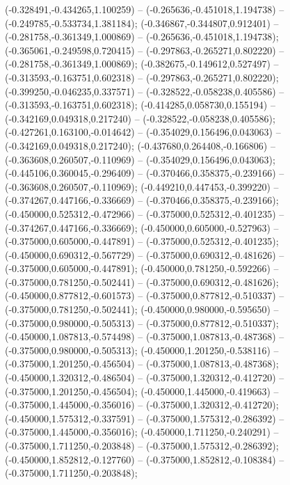  (-0.328491,-0.434265,1.100259) -- (-0.265636,-0.451018,1.194738) -- (-0.249785,-0.533734,1.381184);
 (-0.346867,-0.344807,0.912401) -- (-0.281758,-0.361349,1.000869) -- (-0.265636,-0.451018,1.194738);
 (-0.365061,-0.249598,0.720415) -- (-0.297863,-0.265271,0.802220) -- (-0.281758,-0.361349,1.000869);
 (-0.382675,-0.149612,0.527497) -- (-0.313593,-0.163751,0.602318) -- (-0.297863,-0.265271,0.802220);
 (-0.399250,-0.046235,0.337571) -- (-0.328522,-0.058238,0.405586) -- (-0.313593,-0.163751,0.602318);
 (-0.414285,0.058730,0.155194) -- (-0.342169,0.049318,0.217240) -- (-0.328522,-0.058238,0.405586);
 (-0.427261,0.163100,-0.014642) -- (-0.354029,0.156496,0.043063) -- (-0.342169,0.049318,0.217240);
 (-0.437680,0.264408,-0.166806) -- (-0.363608,0.260507,-0.110969) -- (-0.354029,0.156496,0.043063);
 (-0.445106,0.360045,-0.296409) -- (-0.370466,0.358375,-0.239166) -- (-0.363608,0.260507,-0.110969);
 (-0.449210,0.447453,-0.399220) -- (-0.374267,0.447166,-0.336669) -- (-0.370466,0.358375,-0.239166);
 (-0.450000,0.525312,-0.472966) -- (-0.375000,0.525312,-0.401235) -- (-0.374267,0.447166,-0.336669);
 (-0.450000,0.605000,-0.527963) -- (-0.375000,0.605000,-0.447891) -- (-0.375000,0.525312,-0.401235);
 (-0.450000,0.690312,-0.567729) -- (-0.375000,0.690312,-0.481626) -- (-0.375000,0.605000,-0.447891);
 (-0.450000,0.781250,-0.592266) -- (-0.375000,0.781250,-0.502441) -- (-0.375000,0.690312,-0.481626);
 (-0.450000,0.877812,-0.601573) -- (-0.375000,0.877812,-0.510337) -- (-0.375000,0.781250,-0.502441);
 (-0.450000,0.980000,-0.595650) -- (-0.375000,0.980000,-0.505313) -- (-0.375000,0.877812,-0.510337);
 (-0.450000,1.087813,-0.574498) -- (-0.375000,1.087813,-0.487368) -- (-0.375000,0.980000,-0.505313);
 (-0.450000,1.201250,-0.538116) -- (-0.375000,1.201250,-0.456504) -- (-0.375000,1.087813,-0.487368);
 (-0.450000,1.320312,-0.486504) -- (-0.375000,1.320312,-0.412720) -- (-0.375000,1.201250,-0.456504);
 (-0.450000,1.445000,-0.419663) -- (-0.375000,1.445000,-0.356016) -- (-0.375000,1.320312,-0.412720);
 (-0.450000,1.575312,-0.337591) -- (-0.375000,1.575312,-0.286392) -- (-0.375000,1.445000,-0.356016);
 (-0.450000,1.711250,-0.240291) -- (-0.375000,1.711250,-0.203848) -- (-0.375000,1.575312,-0.286392);
 (-0.450000,1.852812,-0.127760) -- (-0.375000,1.852812,-0.108384) -- (-0.375000,1.711250,-0.203848);
